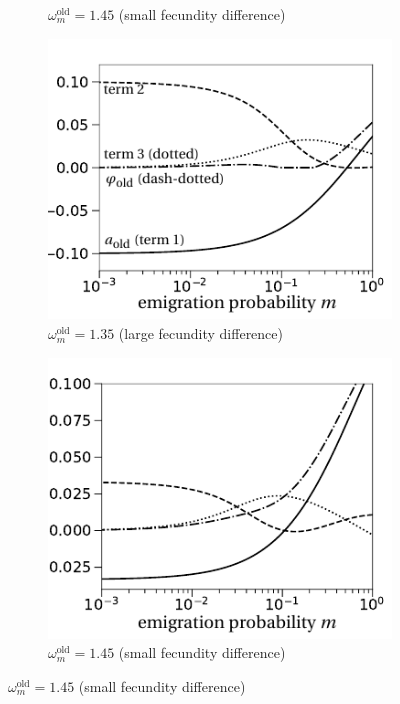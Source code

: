 \documentclass[11pt]{article}
\begin{document}
\begin{figure}[t!]
\begin{subfigure}{.5\textwidth}
		\caption{$\omega^\text{old}_m=1.45$ (small fecundity difference)}
	\end{subfigure}
	\begin{subfigure}{.5\textwidth}
		\centering
		\includegraphics[width=\linewidth]{figS1c.pdf}
		\caption{$\omega^\text{old}_m=1.35$ (large fecundity difference)}
	\end{subfigure}%
	\begin{subfigure}{.5\textwidth}
		\centering
		\includegraphics[width=\linewidth]{figS1d.pdf}
		\caption{$\omega^\text{old}_m=1.45$ (small fecundity difference)}

\end{subfigure}
\end{figure}
\end{document}
